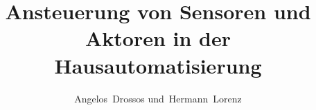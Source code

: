 \documentclass[%
	journal, 	%
	a4paper, 	%
	final, 		%
	]{IEEEtran}
\makeatletter
\def\markboth#1#2{%
	\def\leftmark{\@IEEEcompsoconly{\sffamily}#1}%
	\def\rightmark{\@IEEEcompsoconly{\sffamily}#2}}
\makeatother
\begin{document}
	\title{Ansteuerung von Sensoren und Aktoren in der Hausautomatisierung}
	\author{%
		Angelos~Drossos %
		und~Hermann~Lorenz%
		}

	\markboth{Hochschule für Technik und Wirtschaft Dresden, Master
	Angewandte Informationstechnologien, Forschungsprojekt Sensornetze,
	WS 2012/13}%
	{A. Drossos \MakeLowercase{und} H. Lorenz: Ansteuerung von Sensoren und
	Aktoren in der Hausautomatisierung}

	
	\IEEEtitleabstractindextext{}

	\maketitle

	\IEEEdisplaynontitleabstractindextext








\end{document}

